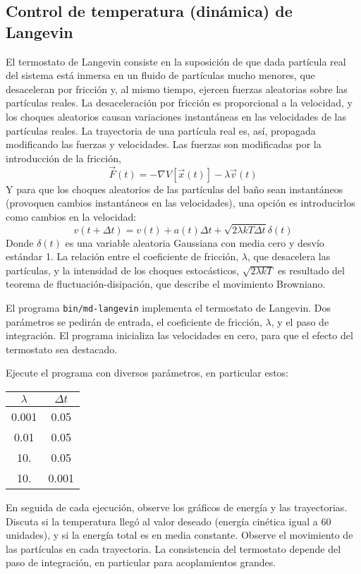 
\subsection{Control de temperatura (dinámica) de Langevin}

El termostato de Langevin consiste en la suposición de que dada
partícula real del sistema está inmersa en un fluido de partículas mucho
menores, que desaceleran por fricción y, al mismo tiempo,
ejercen fuerzas aleatorias sobre las partículas reales. La
desaceleración por fricción es proporcional a la velocidad, y los
choques aleatorios causan variaciones instantáneas en las velocidades de
las partículas reales. La trayectoria de una partícula real es, así,
propagada modificando las fuerzas y velocidades. Las fuerzas son
modificadas por la introducción de la fricción,
\[
\vec{F}(t) = -\nabla V[\vec{x}(t)] - \lambda \vec{v}(t)
\]
Y para que los choques aleatorios de las partículas del baño sean
instantáneos (provoquen cambios instantáneos en las velocidades), una
opción es introducirlos como cambios en la velocidad:
\[
v(t+\Delta t) = v(t) + a(t)\Delta t 
+ \sqrt{2\lambda kT \Delta t}\delta(t)
\] 
Donde $\delta(t)$ es una variable aleatoria Gaussiana con media cero y
desvío estándar 1. La relación entre el coeficiente de fricción, $\lambda$,
que desacelera las partículas, y la intensidad de los choques
estocásticos, $\sqrt{2\lambda kT}$ es resultado del teorema de
fluctuación-disipación, que describe el movimiento Browniano.

El programa {\tt bin/md-langevin} implementa el termostato de Langevin.
Dos parámetros se pedirán de entrada, el coeficiente de fricción,
$\lambda$, y el paso de integración. El programa inicializa las velocidades
en cero, para que el efecto del termostato sea destacado.

Ejecute el programa con diversos parámetros, en particular estos:

{\tt \begin{center}\begin{tabular}{cc}
\hline
 $\lambda$ & $\Delta t$ \\
\hline
0.001 & 0.05 \\
0.01  & 0.05 \\
10.   & 0.05 \\
10.   & 0.001 \\
\hline
\end{tabular}\end{center}}

En seguida de cada ejecución, observe los gráficos de energía y las
trayectorias. Discuta si la temperatura llegó al valor deseado (energía
cinética igual a 60 unidades), y si la energía total es en media
constante. Observe el movimiento de las partículas en cada trayectoria. 
La consistencia del termostato depende del paso de integración, en
particular para acoplamientos grandes.  

